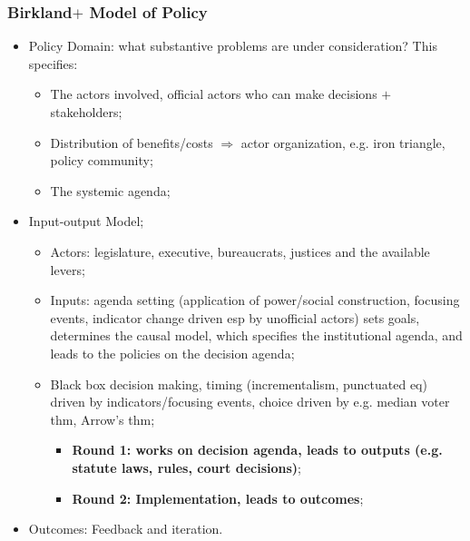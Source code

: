 \documentclass[aspectratio=169]{beamer}
\theoremstyle{principle}
\begin{document}
\begin{frame}
\frametitle{Birkland$+$ Model of Policy}
\begin{itemize}
\item Policy Domain: what substantive problems are under consideration?  This specifies:
\begin{itemize}
\item The actors involved, official actors who can make decisions $+$ stakeholders; 
\item Distribution of benefits/costs $\Rightarrow$ actor organization, e.g. iron triangle, policy community;
\item The systemic agenda; 
\end{itemize}
\bigskip
\item \color{black}Input-output Model;
\begin{itemize}
\item Actors: legislature, executive, bureaucrats, justices and the available levers;
\item Inputs: agenda setting (application of power/social construction, focusing events, indicator change driven esp by unofficial actors) sets goals, determines the causal model, which specifies the institutional agenda, and leads to the policies on the decision agenda;
\item Black box decision making, timing (incrementalism, punctuated eq) driven by indicators/focusing events, choice driven by e.g. median voter thm, Arrow's thm;
\begin{itemize}
\item \textbf{Round 1: works on decision agenda, leads to outputs (e.g. statute laws, rules, court decisions)};
\item \textbf{Round 2: Implementation, leads to outcomes};
 \end{itemize}
\end{itemize}
\bigskip
\item Outcomes: Feedback and iteration.
\end{itemize}
\end{frame}
\end{document}
